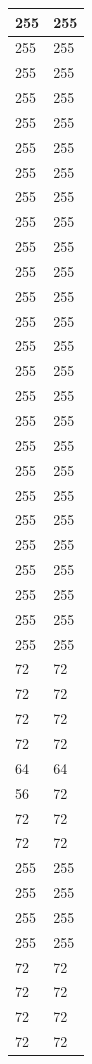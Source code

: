 \documentclass{article}
\begin{document}
\begin{longtable}{|p{4cm}|p{4cm}|}
255 & 255 \\ \hline
255 & 255 \\ \hline
255 & 255 \\ \hline
255 & 255 \\ \hline
255 & 255 \\ \hline
255 & 255 \\ \hline
255 & 255 \\ \hline
255 & 255 \\ \hline
255 & 255 \\ \hline
255 & 255 \\ \hline
255 & 255 \\ \hline
255 & 255 \\ \hline
255 & 255 \\ \hline
255 & 255 \\ \hline
255 & 255 \\ \hline
255 & 255 \\ \hline
255 & 255 \\ \hline
255 & 255 \\ \hline
255 & 255 \\ \hline
255 & 255 \\ \hline
255 & 255 \\ \hline
255 & 255 \\ \hline
255 & 255 \\ \hline
255 & 255 \\ \hline
255 & 255 \\ \hline
255 & 255 \\ \hline
72 & 72 \\ \hline
72 & 72 \\ \hline
72 & 72 \\ \hline
72 & 72 \\ \hline
64 & 64 \\ \hline
56 & 72 \\ \hline
72 & 72 \\ \hline
72 & 72 \\ \hline
255 & 255 \\ \hline
255 & 255 \\ \hline
255 & 255 \\ \hline
255 & 255 \\ \hline
72 & 72 \\ \hline
72 & 72 \\ \hline
72 & 72 \\ \hline
72 & 72 \\ \hline
\end{longtable}
\end{document}
